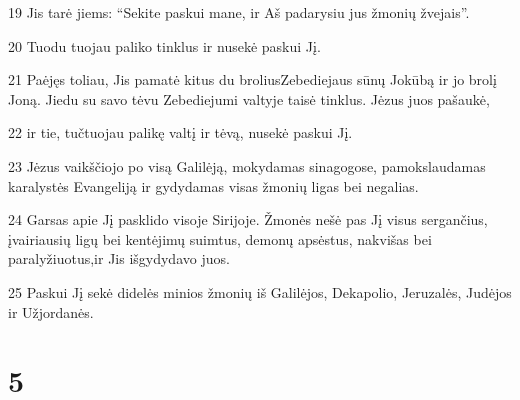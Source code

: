 \par 19 Jis tarė jiems: “Sekite paskui mane, ir Aš padarysiu jus žmonių žvejais”. 
\par 20 Tuodu tuojau paliko tinklus ir nusekė paskui Jį. 
\par 21 Paėjęs toliau, Jis pamatė kitus du brolius­Zebediejaus sūnų Jokūbą ir jo brolį Joną. Jiedu su savo tėvu Zebediejumi valtyje taisė tinklus. Jėzus juos pašaukė, 
\par 22 ir tie, tučtuojau palikę valtį ir tėvą, nusekė paskui Jį. 
\par 23 Jėzus vaikščiojo po visą Galilėją, mokydamas sinagogose, pamokslaudamas karalystės Evangeliją ir gydydamas visas žmonių ligas bei negalias. 
\par 24 Garsas apie Jį pasklido visoje Sirijoje. Žmonės nešė pas Jį visus sergančius, įvairiausių ligų bei kentėjimų suimtus, demonų apsėstus, nakvišas bei paralyžiuotus,­ir Jis išgydydavo juos. 
\par 25 Paskui Jį sekė didelės minios žmonių iš Galilėjos, Dekapolio, Jeruzalės, Judėjos ir Užjordanės.



\chapter{5}


